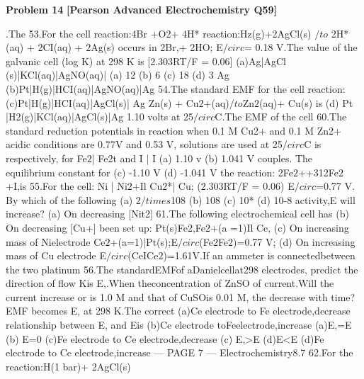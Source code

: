\begin{problembox}
\textbf{Problem 14} \hfill \textbf{[Pearson Advanced Electrochemistry Q59]}
\label{q:ext-pearson-14}

.The
53.For the cell reaction:4Br +O2+ 4H*
reaction:Hz(g)+2AgCl(s)
$/to$ 2H*(aq) + 2CI(aq) + 2Ag(s) occurs in
2Br,+ 2HO; E$/circ$= 0.18 V.The value of
the galvanic cell
(log K) at 298 K is [2.303RT/F = 0.06]
(a)Ag|AgCl (s)|KCl(aq)|AgNO(aq)|
(a) 12
(b) 6
(c) 18
(d) 3
Ag
(b)Pt|H(g)|HCI(aq)|AgNO(aq)|Ag
54.The standard EMF for the cell reaction:
(c)Pt|H(g)|HCI(aq)|AgCl(s)| Ag
Zn(s) + Cu$2$+(aq)$/to$Zn$2$(aq)+ Cu(s) is
(d) Pt |H2(g)|KCl(aq)|AgCl(s)|Ag
1.10 volts at 25$/circ$C.The EMF of the cell
60.The standard reduction potentials in
reaction when 0.1 M Cu2+ and 0.1 M Zn2+
acidic conditions are 0.77V and 0.53 V,
solutions are used at 25$/circ$C is
respectively, for Fe$2$| Fe2t and I | I
(a) 1.10 v
(b) 1.041 V
couples. The equilibrium constant for
(c) -1.10 V
(d) -1.041 V
the reaction: 2Fe$2$++312Fe$2$+I,is
55.For the cell: Ni | Ni$2$+Il Cu$2$*| Cu;
(2.303RT/F = 0.06)
E$/circ$=0.77 V. By which of the following
(a) 2$/times$108
(b) 108
(c) 10*
(d) 10-8
activity,E will increase?
(a) On decreasing [Nit2]
61.The following electrochemical cell has
(b) On decreasing [Cu+]
been set up: Pt(s)Fe$2$,Fe$2$+(a =1)Il Ce,
(c) On increasing mass of Nielectrode
Ce$2$+(a=1)|Pt(s);E$/circ$(Fe$2$Fe$2$)=0.77 V;
(d) On increasing mass of Cu electrode
E$/circ$(CeICe$2$)=1.61V.If an ammeter
is connectedbetween the two platinum
56.The standardEMFof aDanielcellat298
electrodes, predict the direction of flow
Kis E,.When theconcentration of ZnSO
of current.Will the current increase or
is 1.0 M and that of CuSOis 0.01 M, the
decrease with time?
EMF becomes E, at 298 K.The correct
(a)Ce electrode to Fe electrode,decrease
relationship between E, and Eis
(b)Ce electrode toFeelectrode,increase
(a)E,=E
(b) E=0
(c)Fe electrode to Ce electrode,decrease
(c) E,>E
(d)E<E
(d)Fe electrode to Ce electrode,increase
--- PAGE 7 ---
Electrochemistry8.7
62.For the reaction:H(1 bar)+ 2AgCl(s)
\end{problembox}

